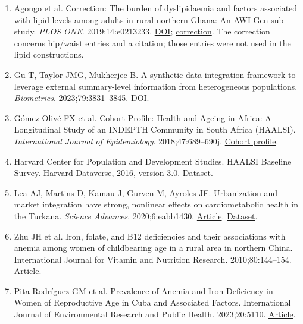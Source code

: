 \documentclass[11pt,letterpaper]{article}
\begin{document}
\begin{enumerate}[label=\arabic*.,leftmargin=2.1em,itemsep=.2em,parsep=0pt]
\item Agongo et al. Correction: The burden of dyslipidaemia and factors associated with lipid levels among adults in rural northern Ghana: An AWI-Gen sub-study. \emph{PLOS ONE}. 2019;14:e0213233. \href{https://doi.org/10.1371/journal.pone.0213233}{DOI}; \href{https://pmc.ncbi.nlm.nih.gov/articles/PMC6392312/}{correction}. The correction concerns hip/\allowbreak{}waist entries and a citation; those entries were not used in the lipid constructions.

\item Gu T, Taylor JMG, Mukherjee B. A synthetic data integration framework to leverage external summary-level information from heterogeneous populations. \emph{Biometrics}. 2023;79:3831–\allowbreak{}3845. \href{https://doi.org/10.1111/biom.13852}{DOI}.

\item Gómez-Olivé FX et al. Cohort Profile: Health and Ageing in Africa: A Longitudinal Study of an INDEPTH Community in South Africa (HAALSI). \emph{International Journal of Epidemiology}. 2018;47:689–\allowbreak{}690j. \href{https://doi.org/10.1093/ije/dyx247}{Cohort profile}.

\item Harvard Center for Population and Development Studies. HAALSI Baseline Survey. Harvard Dataverse, 2016, version 3.0. \href{https://doi.org/10.7910/DVN/F5YHML}{Dataset}.

\item Lea AJ, Martins D, Kamau J, Gurven M, Ayroles JF. Urbanization and market integration have strong, nonlinear effects on cardiometabolic health in the Turkana. \emph{Science Advances}. 2020;6:eabb1430. \href{https://doi.org/10.1126/sciadv.abb1430}{Article}. \href{https://doi.org/10.5061/dryad.2z34tmpjk}{Dataset}.

\item Zhu JH et al. Iron, folate, and B12 deficiencies and their associations with anemia among women of childbearing age in a rural area in northern China. International Journal for Vitamin and Nutrition Research. 2010;80:144–\allowbreak{}154. \href{https://doi.org/10.1024/0300-9831/a000014}{Article}.

\item Pita-Rodríguez GM et al. Prevalence of Anemia and Iron Deficiency in Women of Reproductive Age in Cuba and Associated Factors. International Journal of Environmental Research and Public Health. 2023;20:5110. \href{https://doi.org/10.3390/ijerph20065110}{Article}.


\end{enumerate}
\end{document}
